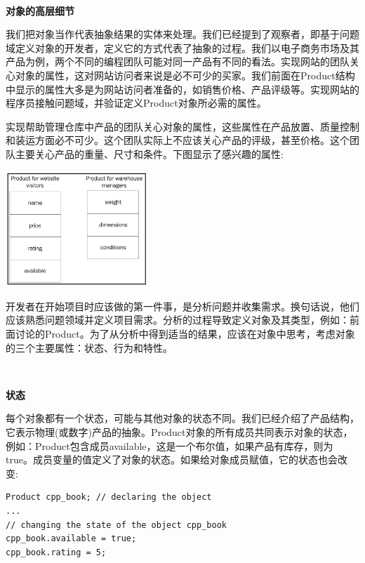 \noindent\textbf{}\ \par
\textbf{对象的高层细节} \ \par
我们把对象当作代表抽象结果的实体来处理。我们已经提到了观察者，即基于问题域定义对象的开发者，定义它的方式代表了抽象的过程。我们以电子商务市场及其产品为例，两个不同的编程团队可能对同一产品有不同的看法。实现网站的团队关心对象的属性，这对网站访问者来说是必不可少的买家。我们前面在Product结构中显示的属性大多是为网站访问者准备的，如销售价格、产品评级等。实现网站的程序员接触问题域，并验证定义Product对象所必需的属性。 \par
实现帮助管理仓库中产品的团队关心对象的属性，这些属性在产品放置、质量控制和装运方面必不可少。这个团队实际上不应该关心产品的评级，甚至价格。这个团队主要关心产品的重量、尺寸和条件。下图显示了感兴趣的属性:\par

\begin{center}
	\includegraphics[width=0.4\textwidth]{content/Section-1/Chapter-3/3}
\end{center}

开发者在开始项目时应该做的第一件事，是分析问题并收集需求。换句话说，他们应该熟悉问题领域并定义项目需求。分析的过程导致定义对象及其类型，例如：前面讨论的Product。为了从分析中得到适当的结果，应该在对象中思考，考虑对象的三个主要属性：状态、行为和特性。\par

\noindent\textbf{}\ \par
\textbf{状态} \ \par
每个对象都有一个状态，可能与其他对象的状态不同。我们已经介绍了产品结构，它表示物理(或数字)产品的抽象。Product对象的所有成员共同表示对象的状态，例如：Product包含成员available，这是一个布尔值，如果产品有库存，则为true。成员变量的值定义了对象的状态。如果给对象成员赋值，它的状态也会改变: \par

\begin{lstlisting}[caption={}]
Product cpp_book; // declaring the object
...
// changing the state of the object cpp_book
cpp_book.available = true;
cpp_book.rating = 5;
\end{lstlisting}


